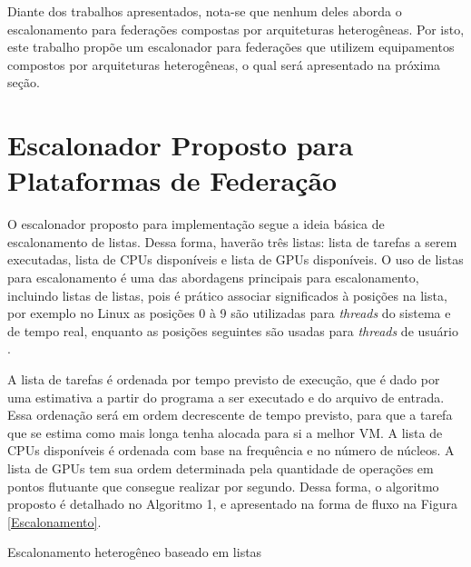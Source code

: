 Diante dos trabalhos apresentados, nota-se que nenhum deles aborda o escalonamento para federações compostas por arquiteturas heterogêneas. Por isto, este trabalho propõe um escalonador para federações que utilizem equipamentos compostos por arquiteturas heterogêneas, o qual será apresentado na próxima seção.

\section{Escalonador Proposto para Plataformas de Federação}

O escalonador proposto para implementação segue a ideia básica de escalonamento de listas. Dessa forma, haverão três listas: lista de tarefas a serem executadas, lista de \acrshort{CPU}s disponíveis e lista de \acrshort{GPU}s disponíveis. O uso de listas para escalonamento é uma das abordagens principais para escalonamento, incluindo listas de listas\cite{MultilevelFQ}, pois é prático associar significados à posições na lista, por exemplo no Linux as posições 0 à 9 são utilizadas para \textit{threads} do sistema e de tempo real, enquanto as posições seguintes são usadas para \textit{threads} de usuário \cite{KernelsComp}.

A lista de tarefas é ordenada por tempo previsto de execução, que é dado por uma estimativa a partir do programa a ser executado e do arquivo de entrada. Essa ordenação será em ordem decrescente de tempo previsto, para que a tarefa que se estima como mais longa tenha alocada para si a melhor \acrshort{VM}. A lista de \acrshort{CPU}s disponíveis é ordenada com base na frequência e no número de núcleos. A lista de \acrshort{GPU}s tem sua ordem determinada pela quantidade de operações em pontos flutuante que consegue realizar por segundo. Dessa forma, o algoritmo proposto é detalhado no Algoritmo 1, e apresentado na forma de fluxo na Figura \ref{Escalonamento}.

\begin{algorithm}
\caption{Escalonamento heterogêneo baseado em listas}
\begin{algorithmic}
			\Else
			\EndIf
		\Else
		\EndIf
	\EndWhile
\EndProcedure
\end{algorithmic}
\end{algorithm}

